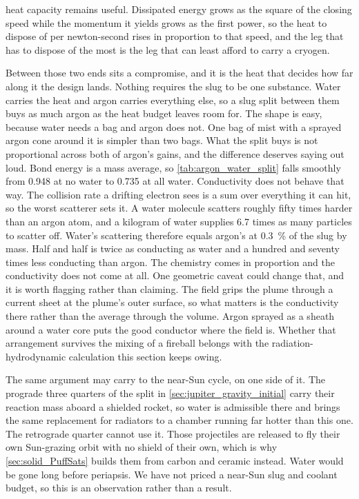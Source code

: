 \documentclass{article}
\begin{document}
heat capacity remains useful. Dissipated energy grows as the square of the closing speed while the momentum it yields grows as the first power, so the heat to dispose of per newton-second rises in proportion to that speed, and the leg that has to dispose of the most is the leg that can least afford to carry a cryogen.

Between those two ends sits a compromise, and it is the heat that decides how far along it the design lands. Nothing requires the slug to be one substance. Water carries the heat and argon carries everything else, so a slug split between them buys as much argon as the heat budget leaves room for. The shape is easy, because water needs a bag and argon does not. One bag of mist with a sprayed argon cone around it is simpler than two bags. What the split buys is not proportional across both of argon's gains, and the difference deserves saying out loud. Bond energy is a mass average, so \autoref{tab:argon_water_split} falls smoothly from \num{0.948} at no water to \num{0.735} at all water. Conductivity does not behave that way. The collision rate a drifting electron sees is a sum over everything it can hit, so the worst scatterer sets it. A water molecule scatters roughly fifty times harder than an argon atom, and a kilogram of water supplies \num{6.7} times as many particles to scatter off. Water's scattering therefore equals argon's at \SI{0.3}{\percent} of the slug by mass. Half and half is twice as conducting as water and a hundred and seventy times less conducting than argon. The chemistry comes in proportion and the conductivity does not come at all. One geometric caveat could change that, and it is worth flagging rather than claiming. The field grips the plume through a current sheet at the plume's outer surface, so what matters is the conductivity there rather than the average through the volume. Argon sprayed as a sheath around a water core puts the good conductor where the field is. Whether that arrangement survives the mixing of a fireball belongs with the radiation-hydrodynamic calculation this section keeps owing.

The same argument may carry to the near-Sun cycle, on one side of it. The prograde three quarters of the split in \autoref{sec:jupiter_gravity_initial} carry their reaction mass aboard a shielded rocket, so water is admissible there and brings the same replacement for radiators to a chamber running far hotter than this one. The retrograde quarter cannot use it. Those projectiles are released to fly their own Sun-grazing orbit with no shield of their own, which is why \autoref{sec:solid_PuffSats} builds them from carbon and ceramic instead. Water would be gone long before periapsis. We have not priced a near-Sun slug and coolant budget, so this is an observation rather than a result.
\end{document}
